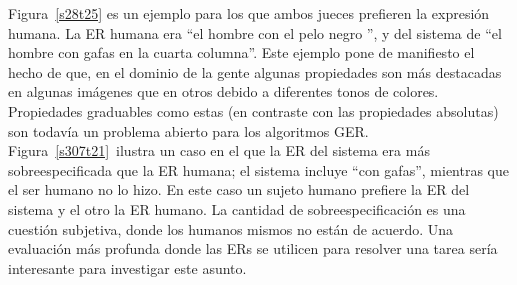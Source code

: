 


Figura~\ref{s28t25} es un ejemplo para los que ambos jueces prefieren la expresi\'on humana. La ER humana era ``el hombre con el pelo negro '', y del sistema de ``el hombre con gafas en la cuarta columna''. Este ejemplo pone de manifiesto el hecho de que, en el dominio de la gente algunas propiedades son m\'as destacadas en algunas im\'agenes que en otros debido a diferentes tonos de colores. Propiedades graduables como estas (en contraste con las propiedades absolutas) son todav\'{i}a un problema abierto para los algoritmos GER.\\

Figura~\ref{s307t21}~ilustra un caso en el que la ER del sistema era m\'as sobreespecificada que la ER humana; el sistema incluye ``con gafas'', mientras que el ser humano no lo hizo. En este caso un sujeto humano prefiere la ER del sistema y el otro la ER humano. La cantidad de sobreespecificaci\'on es una cuesti\'on subjetiva, donde los humanos mismos no est\'an de acuerdo. Una evaluaci\'on m\'as profunda donde las ERs se utilicen para resolver una tarea ser\'{i}a interesante para investigar este asunto.

